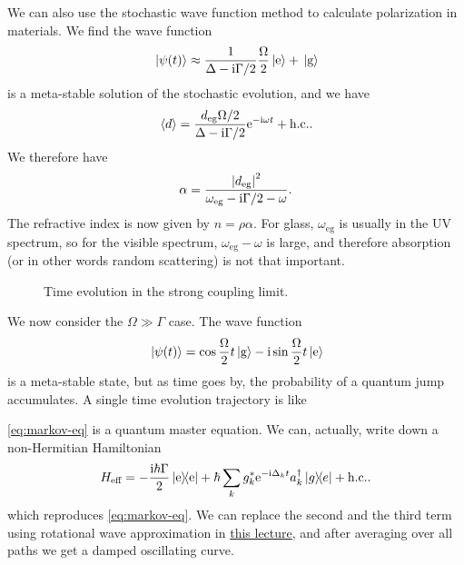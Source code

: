 \documentclass[hyperref, a4paper]{article}
\newcommand*{\ii}{\mathrm{i}}
\newcommand*{\ee}{\mathrm{e}}
\begin{document}
We can also use the stochastic wave function method to calculate polarization in materials.
We find the wave function
\begin{equation}
    \ket*{\psi(t)} \approx \frac{1}{\Delta - \ii \Gamma / 2} \frac{\Omega}{2} \ket*{\text{e}} + \ket*{\text{g}}
\end{equation}
is a meta-stable solution of the stochastic evolution, and we have 
\begin{equation}
    \expval*{d} = \frac{d_\text{eg} \Omega / 2}{\Delta - \ii \Gamma / 2} \ee^{- \ii \omega t} + \text{h.c.}.
\end{equation}
We therefore have 
\begin{equation}
    \alpha = \frac{\abs{d_\text{eg}}^2}{\omega_\text{eg} - \ii \Gamma / 2 - \omega}.
\end{equation}
The refractive index is now given by $n = \rho \alpha$. For glass, $\omega_\text{eg}$ is usually in the UV 
spectrum, so for the visible spectrum, $\omega_\text{eg} - \omega$ is large, and therefore absorption 
(or in other words random scattering) is not that important.

\begin{figure}
    \centering
    
    \caption{Time evolution in the strong coupling limit.}
\end{figure}

We now consider the $\Omega \gg \Gamma$ case. The wave function 
\begin{equation}
    \ket*{\psi(t)} = \cos \frac{\Omega}{2} t \ket*{\text{g}} - \ii \sin \frac{\Omega}{2} t \ket*{\text{e}}
\end{equation}
is a meta-stable state, but as time goes by, the probability of a quantum jump accumulates. 
A single time evolution trajectory is like 

\eqref{eq:markov-eq} is a quantum master equation. We can, actually, write down a non-Hermitian Hamiltonian
\begin{equation}
    H_\text{eff} = - \frac{\ii \hbar \Gamma}{2} \dyad{\text{e}} 
    + \hbar \sum_{k} g_k^* \ee^{- \ii \Delta_k t} a_k^\dagger \dyad{g}{e} + \text{h.c.}.
\end{equation}
which reproduces \eqref{eq:markov-eq}. We can replace the second and the third term using rotational 
wave approximation in \href{10-28.pdf}{this lecture}, and after averaging over all paths we get a 
damped oscillating curve.
\end{document}
